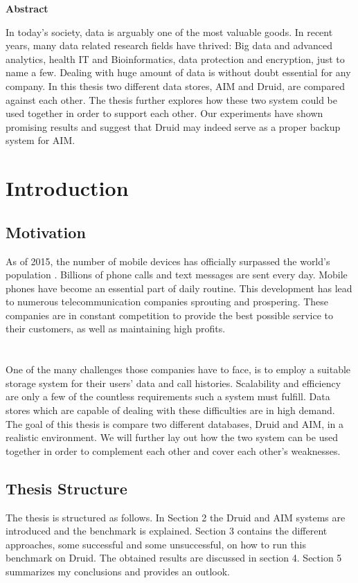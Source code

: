 \documentclass[11pt,singlecolumn]{scrartcl}
\begin{document}
\hspace{60mm}
\begin{center}
 \textbf{Abstract} \end{center}


In today's society, data is arguably one of the most valuable goods. In recent years, many data related research fields have thrived: Big data and advanced analytics, health IT and Bioinformatics, data protection and encryption, just to name a few. Dealing with huge amount of data is without doubt essential for any company. In this thesis two different data stores, AIM and Druid, are compared against each other. The thesis further explores how these two system could be used together in order to support each other. Our experiments have shown promising results and suggest that Druid may indeed serve as a proper backup system for AIM.


\clearpage
\tableofcontents
\clearpage
\section{Introduction}
\subsection{Motivation}
As of 2015, the number of mobile devices has officially surpassed the world's population \cite{ind}. Billions of phone calls and text messages are sent every day. Mobile phones have become an essential part of daily routine. This development has lead to numerous telecommunication companies sprouting and prospering. These companies are in constant competition to provide the best possible service to their customers, as well as maintaining high profits.\\\\\\One of the many challenges those companies have to face, is to employ a suitable storage system for their users' data and call histories. Scalability and efficiency are only a few of the countless requirements such a system must fulfill. Data stores which are capable of dealing with these difficulties are in high demand. The goal of this thesis is compare two different databases, Druid and AIM, in a realistic environment. We will further lay out how the two system can be used together in order to complement each other and cover each other's weaknesses.\\[1 cm]



\subsection{Thesis Structure}
The thesis is structured as follows. In Section 2 the Druid and AIM systems are introduced and the benchmark is explained. Section 3 contains the different approaches, some successful and some unsuccessful, on how to run this benchmark on Druid. The obtained results are discussed in section 4. Section 5 summarizes my conclusions and provides an outlook.
\clearpage
\end{document}
